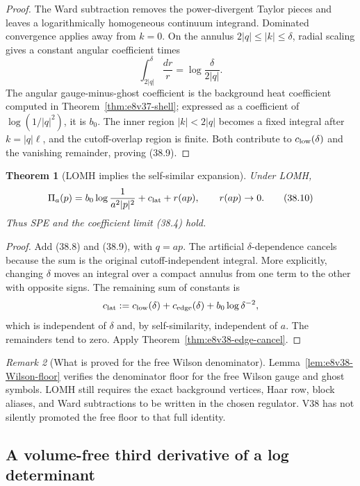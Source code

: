 \documentclass[11pt,oneside]{book}
\newtheorem{theorem}{Theorem}[chapter]
\theoremstyle{definition}
\theoremstyle{remark}
\newtheorem{remark}[theorem]{Remark}
\begin{document}
\begin{proof}
The Ward subtraction removes the power-divergent Taylor pieces and
leaves a logarithmically homogeneous continuum integrand.  Dominated
convergence applies away from \(k=0\).  On the annulus
\(2|q|\leq|k|\leq\delta\), radial scaling gives a constant angular
coefficient times
\[
 \int_{2|q|}^{\delta}\frac{dr}{r}
 =
 \log\frac{\delta}{2|q|}.
\]
The angular gauge-minus-ghost coefficient is the background heat
coefficient computed in
Theorem~\ref{thm:e8v37-shell}; expressed as a coefficient of
\(\log(1/|q|^2)\), it is \(b_0\).  The inner region
\(|k|<2|q|\) becomes a fixed integral after \(k=|q|\ell\), and the
cutoff-overlap region is finite.  Both contribute to
\(c_{\rm low}(\delta)\) and the vanishing remainder, proving (38.9).
\end{proof}

\begin{theorem}[LOMH implies the self-similar expansion]
\label{thm:e8v38-LOMH}
Under LOMH,
\[
 \Pi_a(p)
 =
 b_0\log\frac1{a^2|p|^2}
 +c_{\rm lat}+r(ap),\qquad r(ap)\to0.                            \tag{38.10}
\]
Thus SPE and the coefficient limit (38.4) hold.
\end{theorem}

\begin{proof}
Add (38.8) and (38.9), with \(q=ap\).  The artificial
\(\delta\)-dependence cancels because the sum is the original
cutoff-independent integral.  More explicitly, changing \(\delta\)
moves an integral over a compact annulus from one term to the other
with opposite signs.  The remaining sum of constants is
\[
 c_{\rm lat}:=
 c_{\rm low}(\delta)+c_{\rm edge}(\delta)+b_0\log\delta^{-2},
\]
which is independent of \(\delta\) and, by self-similarity,
independent of \(a\).  The remainders tend to zero.  Apply
Theorem~\ref{thm:e8v38-edge-cancel}.
\end{proof}

\begin{remark}[What is proved for the free Wilson denominator]
\label{rem:e8v38-free-versus-background}
Lemma~\ref{lem:e8v38-Wilson-floor} verifies the denominator floor
for the free Wilson gauge and ghost symbols.  LOMH still requires
the exact background vertices, Haar row, block aliases, and Ward
subtractions to be written in the chosen regulator.  V38 has not
silently promoted the free floor to that full identity.
\end{remark}

\subsection{A volume-free third derivative of a log determinant}
\end{document}

